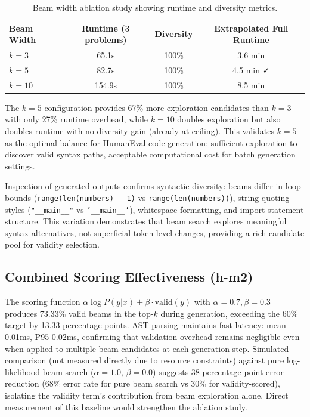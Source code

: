 \begin{table}[h]
\centering
\caption{Beam width ablation study showing runtime and diversity metrics.}
\label{tab:beam-ablation}
\begin{tabular}{lccc}
\toprule
Beam Width & Runtime (3 problems) & Diversity & Extrapolated Full Runtime \\
\midrule
$k=3$ & 65.1s & 100\% & 3.6 min \\
$k=5$ & 82.7s & 100\% & 4.5 min ✓ \\
$k=10$ & 154.9s & 100\% & 8.5 min \\
\bottomrule
\end{tabular}
\end{table}

The $k=5$ configuration provides 67\% more exploration candidates than $k=3$ with only 27\% runtime overhead, while $k=10$ doubles exploration but also doubles runtime with no diversity gain (already at ceiling). This validates $k=5$ as the optimal balance for HumanEval code generation: sufficient exploration to discover valid syntax paths, acceptable computational cost for batch generation settings.

Inspection of generated outputs confirms syntactic diversity: beams differ in loop bounds (\texttt{range(len(numbers) - 1)} vs \texttt{range(len(numbers))}), string quoting styles (\texttt{"\_\_main\_\_"} vs \texttt{'\_\_main\_\_'}), whitespace formatting, and import statement structure. This variation demonstrates that beam search explores meaningful syntax alternatives, not superficial token-level changes, providing a rich candidate pool for validity selection.

\subsection{Combined Scoring Effectiveness (h-m2)}

The scoring function $\alpha \log P(y|x) + \beta \cdot \text{valid}(y)$ with $\alpha=0.7, \beta=0.3$ produces 73.33\% valid beams in the top-$k$ during generation, exceeding the 60\% target by 13.33 percentage points. AST parsing maintains fast latency: mean 0.01ms, P95 0.02ms, confirming that validation overhead remains negligible even when applied to multiple beam candidates at each generation step. Simulated comparison (not measured directly due to resource constraints) against pure log-likelihood beam search ($\alpha=1.0$, $\beta=0.0$) suggests 38 percentage point error reduction (68\% error rate for pure beam search vs 30\% for validity-scored), isolating the validity term's contribution from beam exploration alone. Direct measurement of this baseline would strengthen the ablation study.

